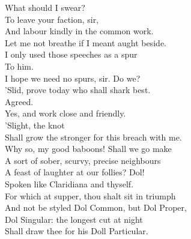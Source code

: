 \documentclass[a4paper,oneside,12pt]{memoir}
\begin{document}
\begin{drama*}
\subtlespeaks What should I swear?\\
\dolspeaks {} To leave your faction, sir,\\
And labour kindly in the common work.\\
\subtlespeaks Let me not breathe if I meant aught beside.\\
I only used those speeches as a spur\\
To him.\\
\dolspeaks {} I hope we need no spurs, sir. Do we?\\
\facespeaks 'Slid, prove today who shall shark best.\\
\subtlespeaks {} Agreed.\\
\dolspeaks Yes, and work close and friendly.\\
\subtlespeaks {} 'Slight, the knot\\
Shall grow the stronger for this breach with me.\\
\dolspeaks Why so, my good baboons! Shall we go make\\
A sort of sober, scurvy, precise neighbours\\
A feast of laughter at our follies?
\subtlespeaks {} Dol!\\
Spoken like Claridiana and thyself.\\
\facespeaks For which at supper, thou shalt sit in triumph\\
And not be styled Dol Common, but Dol Proper,\\
Dol Singular: the longest cut at night\\
Shall draw thee for his Doll Particular.\\

\pagebreak
\scene


\end{drama*}
\end{document}
